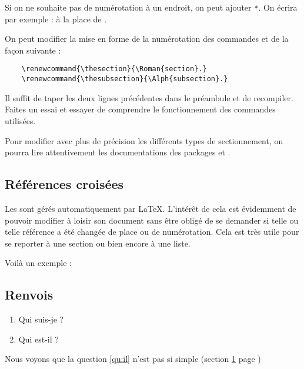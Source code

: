 \documentclass[10pt,french]{book}
\begin{document}
\begin{info}
    Si on ne souhaite pas de numérotation à un endroit, on peut ajouter \verb!*!. On écrira par exemple :
     à la place de .
\end{info}

On peut modifier la mise en forme de la numérotation des commandes  et  de la façon suivante :
\begin{Verbatim}
    \renewcommand{\thesection}{\Roman{section}.}
    \renewcommand{\thesubsection}{\Alph{subsection}.}
\end{Verbatim}

Il suffit de taper les deux lignes précédentes dans le préambule et de recompiler. Faites un essai et essayer de comprendre le fonctionnement des commandes utilisées.

\begin{info}
    Pour modifier avec plus de précision les différents types de sectionnement, on pourra lire attentivement les documentations des packages  et .
\end{info}

\subsection{Références croisées}

Les  sont gérés automatiquement par \LaTeX. L'intérêt de cela est évidemment de pouvoir modifier à loisir son document sans être obligé de se demander si telle ou telle référence a été changée de place ou de numérotation. Cela est très utile pour se reporter à une section ou bien encore à une liste.

Voilà un exemple :\bigskip

{\NewFont\reset
\begin{SideBySideExample}
    \section{Renvois}\label{sec}
        \begin{enumerate}
            \item Qui suis-je ?\label{qu:je}
            \item Qui est-il ?\label{qu:il}
        \end{enumerate}
    Nous voyons que la question \ref{qu:il}
    n'est pas si simple
    (section \ref{sec} page \pageref{sec})
\end{SideBySideExample}
\unreset
\bigskip}
\end{document}
